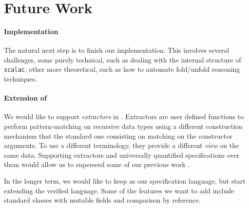 \section{Future Work}
\paragraph{Implementation}
The natural next step is to finish our implementation. This involves several
challenges, some purely technical, such as dealing with the internal structure
of {\tt scalac}, other more theoretical, such as how to automate fold/unfold
reasoning techniques.

\paragraph{Extension of {\purescala}}
We would like to support \emph{extractors} \cite{burak06mop} in {\purescala}. Extractors are user
defined functions to perform pattern-matching on recursive data types using a
different construction mechanism that the standard one consisting on matching
on the constructor arguments. To use a different terminology, they provide a
different \emph{view} on the same data. Supporting extractors and universally
quantified specifications over them would allow us to superseed some of our
previous work \cite{dotta08pm}.

In the longer term, we would like to keep {\purescala} as our specification
language, but start extending the verified language. Some of the features we
want to add include standard classes with mutable fields and comparison by
reference.
